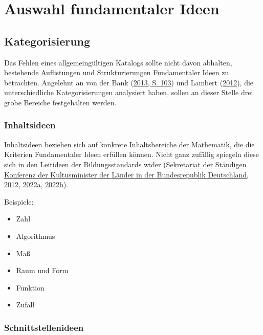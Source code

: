 \documentclass[
]{scrbook}
\providecommand{\tightlist}{%
  \setlength{\itemsep}{0pt}\setlength{\parskip}{0pt}}
\theoremstyle{definition}
\theoremstyle{definition}
\theoremstyle{definition}
\theoremstyle{definition}
\theoremstyle{remark}
\begin{document}
\hypertarget{auswahl-fundamentaler-ideen}{%
\section{Auswahl fundamentaler Ideen}\label{auswahl-fundamentaler-ideen}}

\hypertarget{kategorisierung}{%
\subsection{Kategorisierung}\label{kategorisierung}}

Das Fehlen eines allgemeingültigen Katalogs sollte nicht davon abhalten, bestehende Auflistungen und Strukturierungen Fundamentaler Ideen zu betrachten. Angelehnt an von der Bank (\protect\hyperlink{ref-vonderBank:2013}{2013, S. 103}) und Lambert (\protect\hyperlink{ref-Lambert:2012}{2012}), die unterschiedliche Kategorisierungen analysiert haben, sollen an dieser Stelle drei grobe Bereiche festgehalten werden.

\hypertarget{inhaltsideen}{%
\subsubsection{Inhaltsideen}\label{inhaltsideen}}

Inhaltsideen beziehen sich auf konkrete Inhaltsbereiche der Mathematik, die die Kriterien Fundamentaler Ideen erfüllen können. Nicht ganz zufällig spiegeln diese sich in den Leitideen der Bildungsstandards wider (\protect\hyperlink{ref-KMK:2012}{Sekretariat der Ständigen Konferenz der Kultusminister der Länder in der Bundesrepublik Deutschland, 2012}, \protect\hyperlink{ref-SekretariatderStandigenKonferenzderKultusministerderLanderinderBundesrepublikDeutschland2022}{2022a}, \protect\hyperlink{ref-SekretariatderStandigenKonferenzderKultusministerderLanderinderBundesrepublikDeutschland2022a}{2022b}).

Beispiele:

\begin{itemize}
\tightlist
\item
  Zahl
\item
  Algorithmus
\item
  Maß
\item
  Raum und Form
\item
  Funktion
\item
  Zufall
\end{itemize}

\hypertarget{schnittstellenideen}{%
\subsubsection{Schnittstellenideen}\label{schnittstellenideen}}
\end{document}
